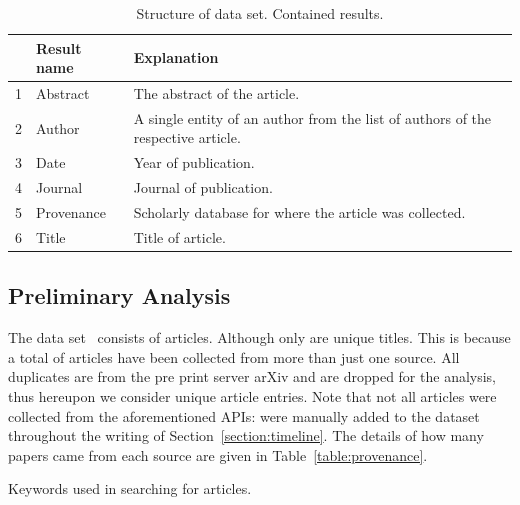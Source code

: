 \documentclass{article}
\newcommand{\totalarticles}{}
\newcommand{\uniquetitles}{}
\newcommand{\numberofduplicates}{}
\newcommand{\manual}{}
\begin{document}
\begin{table}[!hbtp]
    \begin{center}
        \begin{tabular}{lll}
            \toprule
             & Result name & Explanation \\
             \midrule
             1 & Abstract & The abstract of the article.\\ 
             2 & Author & A single entity of an author from the list of
             authors of the respective article.\\ 
             3 & Date & Year of publication.\\ 
             4 & Journal & Journal of publication.\\ 
             5 & Provenance & Scholarly database for where the article was
             collected.\\ 
             6 & Title & Title of article.\\ 
            \bottomrule
        \end{tabular}
    \end{center}
    \caption{Structure of data set. Contained results.}
    \label{table:result_set}
\end{table}

\subsection{Preliminary Analysis}

The data set~\cite{} consists of \totalarticles articles. Although only
\uniquetitles are unique titles. This is because a total of \numberofduplicates
articles have been collected from more than just one source. All
\numberofduplicates duplicates are from the pre print server arXiv and are
dropped for the analysis, thus hereupon we consider \uniquetitles unique article
entries. Note that not all articles were collected from the aforementioned APIs:
\manual were manually added to the dataset throughout the writing of
Section~\ref{section:timeline}. The details of how many papers came from
each source are given in Table~\ref{table:provenance}.

\begin{table}[!hbtp]
    \begin{center}
    
    \end{center}
    \caption{Keywords used in searching for articles.}
    \label{table:provenance}
\end{table}
\end{document}
